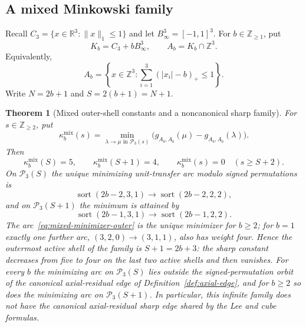 \documentclass[pdflatex,sn-mathphys-num]{sn-jnl}
\theoremstyle{thmstyleone}
\newtheorem{theorem}{Theorem}[section]
\theoremstyle{thmstylethree}
\theoremstyle{thmstyletwo}
\newcommand{\Z}{\mathbb Z}
\newcommand{\R}{\mathbb R}
\begin{document}
\subsection{A mixed Minkowski family}

Recall $C_3=\{x\in\R^3:\|x\|_1\le1\}$ and let
$B_\infty^3=[-1,1]^3$.  For
$b\in\Z_{\ge1}$, put
\[
 K_b=C_3+bB_\infty^3,\qquad A_b=K_b\cap\Z^3.
\]
Equivalently,
\begin{equation}
 A_b=\left\{x\in\Z^3:
 \sum_{i=1}^3(|x_i|-b)_+\le1\right\}.                \label{eq:mixed-membership}
\end{equation}
Write $N=2b+1$ and $S=2(b+1)=N+1$.

\begin{theorem}[Mixed outer-shell constants and a noncanonical sharp family]
\label{thm:mixed-sharp}
For $s\in\Z_{\ge2}$, put
\begin{equation}
 \kappa^{\mathrm{mix}}_b(s)
 =\min_{\lambda\to\mu\text{ in }\mathcal P_3(s)}
 \bigl(g_{A_b,A_b}(\mu)-g_{A_b,A_b}(\lambda)\bigr).   \label{eq:mixed-kappa-def}
\end{equation}
Then
\begin{equation}
 \kappa^{\mathrm{mix}}_b(S)=5,\qquad
 \kappa^{\mathrm{mix}}_b(S+1)=4,\qquad
 \kappa^{\mathrm{mix}}_b(s)=0\quad(s\ge S+2).         \label{eq:mixed-kappa}
\end{equation}
On $\mathcal P_3(S)$ the unique minimizing unit-transfer arc modulo signed
permutations is
\begin{equation}
 \operatorname{sort}(2b-2,3,1)
 \longrightarrow
 \operatorname{sort}(2b-2,2,2),                     \label{eq:mixed-minimizer}
\end{equation}
and on $\mathcal P_3(S+1)$ the minimum is attained by
\begin{equation}
 \operatorname{sort}(2b-1,3,1)
 \longrightarrow
 \operatorname{sort}(2b-1,2,2).                     \label{eq:mixed-minimizer-outer}
\end{equation}
The arc~\eqref{eq:mixed-minimizer-outer} is the unique minimizer for
$b\ge2$; for $b=1$ exactly one further arc, $(3,2,0)\to(3,1,1)$, also has
weight four.  Hence the outermost active shell of the family is
$S+1=2b+3$: the sharp constant decreases from five to four on the last two
active shells and then vanishes.  For every $b$ the minimizing arc on
$\mathcal P_3(S)$ lies outside the signed-permutation orbit of the
canonical axial-residual edge of Definition~\ref{def:axial-edge}, and for
$b\ge2$ so does the minimizing arc on
$\mathcal P_3(S+1)$.  In particular, this infinite family does not have the
canonical axial-residual sharp edge shared by the Lee and cube formulas.
\end{theorem}
\end{document}
